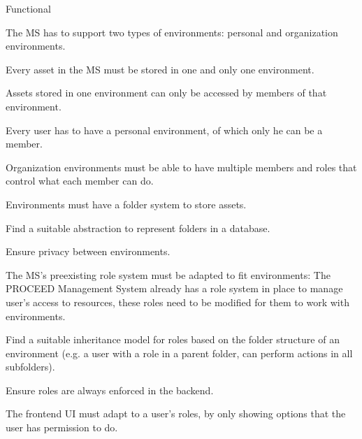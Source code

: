 \begin{myEnumerate}
  \item Functional
    \begin{myEnumerate}
      \item The MS has to support two types of environments: personal and organization environments.
        \begin{myEnumerate}
          \item Every asset in the MS must be stored in one and only one environment.

          \item Assets stored in one environment can only be accessed by members of that
            environment.

          \item Every user has to have a personal environment, of which only he can be a member.

          \item Organization environments must be able to have multiple members and roles that control what each member can do.

          \item Environments must have a folder system to store assets.
            \begin{myEnumerate}
              \item Find a suitable abstraction to represent folders in a database.

              \item Ensure privacy between environments.


              \item The MS's preexisting role system must be adapted to fit environments:
                The PROCEED Management System already has a role system in place to manage user's access to resources, these roles need to be modified for them to work with environments.
                \begin{myEnumerate}
                  \item Find a suitable inheritance model for roles based on the folder
                    structure of an environment (e.g. a user with a role in a parent
                    folder, can perform actions in all subfolders).
                  \item Ensure roles are always enforced in the backend.
                  \item The frontend UI must adapt to a user's roles, by only showing options that the user has permission to do.
                \end{myEnumerate}
            \end{myEnumerate}


\end{myEnumerate}
\end{myEnumerate}
\end{myEnumerate}
